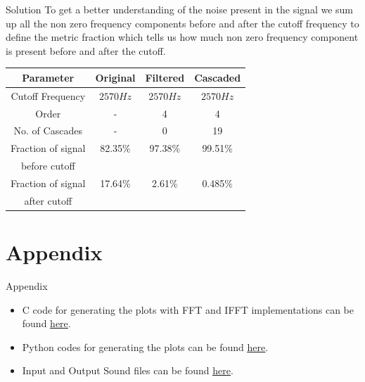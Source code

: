\documentclass{beamer}
\begin{document}
\begin{frame}{Solution}
To get a better understanding of the noise present in the signal we sum up all the non zero frequency
components before and after the cutoff frequency to define the metric fraction which tells us how much non zero frequency component is present before and after the cutoff.
    \begin{center}
        \begin{tabular}{ |c|c|c|c| } 
             \hline
             Parameter & Original & Filtered & Cascaded\\
             \hline
             Cutoff Frequency & $2570Hz$ & $2570 Hz$ & $2570 Hz$\\ 
             \hline
             Order & - & 4 & 4 \\ 
             \hline
            No. of Cascades & - & 0 & 19 \\ 
             \hline
            Fraction of signal & 82.35\% & 97.38\% &  99.51\%\\
            before cutoff & & &\\
            \hline
            Fraction of signal  & 17.64\% & 2.61\%  & 0.485\%\\
            after cutoff & & &\\
            \hline
        \end{tabular}
    \end{center}
\end{frame}

\section{Appendix}
\begin{frame}{Appendix}
    \begin{itemize}
        \item{C code for generating the plots with FFT and IFFT implementations can be found
        \href{https://github.com/AbdurNawaz/EE3025/tree/main/Assignment-1/codes}{\uline{here}}.}
        \item{Python codes for generating the plots can be found \href{https://github.com/AbdurNawaz/EE3025/tree/main/Assignment-1/codes}{\uline{here}}.}
        \item{Input and Output Sound files can be found \href{https://github.com/AbdurNawaz/EE3025/tree/main/Assignment-1/soundfiles}{\uline{here}}.}
    \end{itemize}
    
\end{frame}
\end{document}
